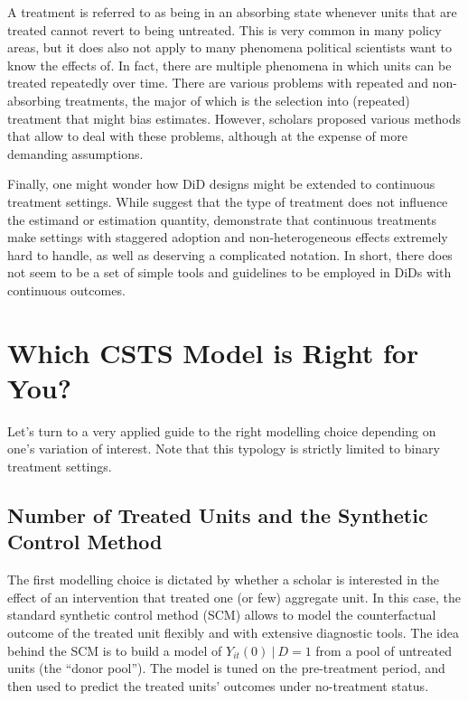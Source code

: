 \documentclass[hidelinks]{article}\usepackage[]{graphicx}\usepackage[]{color}
\begin{document}


A treatment is referred to as being in an absorbing state whenever units that are treated cannot revert to being untreated. This is very common in many policy areas, but it does also not apply to many phenomena political scientists want to know the effects of. In fact, there are multiple phenomena in which units can be treated repeatedly over time. There are various problems with repeated and non-absorbing treatments, the major of which is the selection into (repeated) treatment that might bias estimates. However, scholars proposed various methods that allow to deal with these problems, although at the expense of more demanding assumptions.

Finally, one might wonder how DiD designs might be extended to continuous treatment settings. While \textcite{Angrist2009} suggest that the type of treatment does not influence the estimand or estimation quantity, \textcite{Callaway2021} demonstrate that continuous treatments make settings with staggered adoption and non-heterogeneous effects extremely hard to handle, as well as deserving a complicated notation. In short, there does not seem to be a set of simple tools and guidelines to be employed in DiDs with continuous outcomes.


\section{Which CSTS Model is Right for You?}

Let's turn to a very applied guide to the right modelling choice depending on one's variation of interest. Note that this typology is strictly limited to binary treatment settings.

\subsection{Number of Treated Units and the Synthetic Control Method}

The first modelling choice is dictated by whether a scholar is interested in the effect of an intervention that treated one (or few) aggregate unit. In this case, the standard synthetic control method (SCM) allows to model the counterfactual outcome of the treated unit flexibly and with extensive diagnostic tools. The idea behind the SCM is to build a model of $Y_{it}(0)\ | \ D=1$ from a pool of untreated units (the ``donor pool''). The model is tuned on the pre-treatment period, and then used to predict the treated units' outcomes under no-treatment status.
\end{document}

